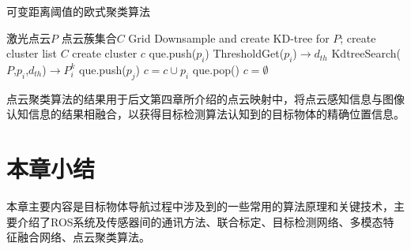\begin{algorithm}[!h]
    \caption{可变距离阈值的欧式聚类算法}
    \label{algorithm1}
    \renewcommand{\algorithmicrequire}{\textbf{Input:}}
    \renewcommand{\algorithmicensure}{\textbf{Output:}}
    \renewcommand{\algorithmiccomment}[1]{\hfill $\triangleright$ #1}
    \begin{algorithmic}[1]
        \REQUIRE 激光点云$P$  %
        \ENSURE 点云蔟集合$C$    %
        \STATE  Grid Downsample and create KD-tree for $P$;
        \STATE  create cluster list $C$
        \STATE  create cluster $c$
            \STATE  que.push(${p_i}$)
                \STATE  ThresholdGet(${p_i}$)$ \to {d_{th}}$
                \STATE  KdtreeSearch($P$,${p_i}$,${d_{th}}$)$ \to P_i^k$
                    \STATE  que.push(${p_j}$)
                \ENDFOR
                \STATE  $c = c \cup {p_i}$
                \STATE  que.pop()
            \ENDWHILE
            $c = \emptyset $
        \ENDFOR
    \end{algorithmic}
\end{algorithm}

点云聚类算法的结果用于后文第四章所介绍的点云映射中，将点云感知信息与图像认知信息的结果相融合，以获得目标检测算法认知到的目标物体的精确位置信息。


\section{本章小结}
本章主要内容是目标物体导航过程中涉及到的一些常用的算法原理和关键技术，主要介绍了ROS系统及传感器间的通讯方法、联合标定、目标检测网络、多模态特征融合网络、点云聚类算法。


